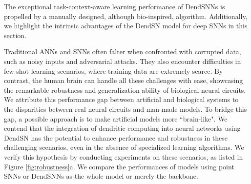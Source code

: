 The exceptional task-context-aware learning performance of DendSNNs is propelled by a manually designed, although bio-inspired, algorithm. Additionally, we highlight the intrinsic advantages of the DendSN model for deep SNNs in this section.

Traditional ANNs and SNNs often falter when confronted with corrupted data, such as noisy inputs and adversarial attacks. They also encounter difficulties in few-shot learning scenarios, where training data are extremely scarce. By contrast, the human brain can handle all these challenges with ease, showcasing the remarkable robustness and generalization ability of biological neural circuits. We attribute this performance gap between artificial and biological systems to the disparities between real neural circuits and man-made models. To bridge this gap, a possible approach is to make artificial models more ``brain-like". We contend that the integration of dendritic computing into neural networks using DendSN has the potential to enhance performance and robustness in these challenging scenarios, even in the absence of specialized learning algorithms. We verify this hypothesis by conducting experiments on these scenarios, as listed in Figure \ref{fig:robustness}a. We compare the performances of models using point SNNs or DendSNNs as the whole model or merely the backbone.

